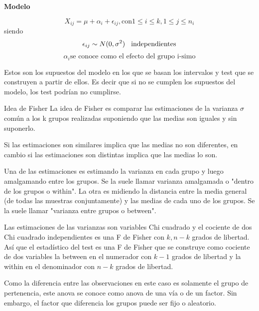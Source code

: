 \documentclass[a4paper,12pt]{article}
\begin{document}
\textbf{\textcolor{BlueGreen}{Modelo}}

\[X_{ij}=\mu+\alpha_i+\epsilon_{ij} , \text{con} 1 \leq i \leq k, 1 \leq j \leq n_i
\]
siendo
\[
\epsilon_{ij}\sim N(0,\sigma^2) \hspace{0.3cm} \text{independientes}
\]
\[
\alpha_i \text{se conoce como el efecto del grupo i-simo} 
\]
\begin{center}
	\fbox{\parbox[t][2.4cm][b]{15cm}{	\textbf{\textcolor{BlueGreen!70}{Las variables aleatorias observadas  son normales, independientes entre sí dentro de las muestras y entre las muestras y homocedásticas (con varianzas iguales).}}}}
\end{center}

Estos son los supuestos del modelo en los que se basan los intervalos y test que se construyen a partir de ellos. Es decir que si no se cumplen los supuestos del modelo, los test podrían no cumplirse.

\textcolor{BlueGreen}{Idea de Fisher}
La idea de Fisher es comparar las estimaciones de la varianza $\sigma$ común a los k grupos realizadas suponiendo que las medias son iguales y sin suponerlo.

Si las estimaciones son similares implica que las medias no son diferentes, en cambio si las estimaciones son distintas implica que las medias lo son.

Una de las estimaciones es estimando la varianza en cada grupo y luego amalgamando entre los grupos. Se la suele llamar varianza amalgamada o "dentro de los grupos o within".
La otra es midiendo la distancia entre la media general (de todas las muestras conjuntamente) y las medias de cada uno de los grupos. Se la suele llamar "varianza entre grupos o between".

Las estimaciones de las varianzas son variables Chi cuadrado y el cociente de dos Chi cuadrado independientes es una F de Fisher con $k,n-k$ grados de libertad. Así que el estadístico del test es una F de Fisher que se construye como cociente de dos variables la between en el numerador con $k-1$ grados de libertad y la within en el denominador con $n-k$ grados de libertad.

Como la diferencia entre las observaciones en este caso es solamente el grupo de pertenencia, este anova se conoce como anova de una vía o de un factor.
Sin embargo, el factor que diferencia los grupos puede ser fijo o aleatorio.

\begin{center}
\end{center}
\end{document}
